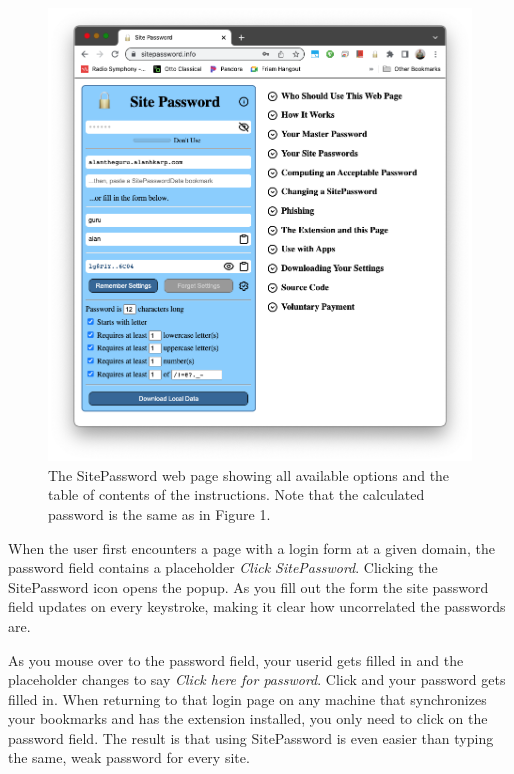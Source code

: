 \begin{figure}
\begin{center}
  \includegraphics[scale=0.30]{soupsfig2.png}
\end{center}
\caption{\label{fig:webpage} The SitePassword web page showing all available options and the table of contents of the instructions.  Note that the calculated password is the same as in Figure 1. }
\end{figure}

When the user first encounters a page with a login form at a given domain, the password field contains a placeholder {\em Click SitePassword}.  Clicking the SitePassword icon opens the popup.  As you fill out the form the site password field updates on every keystroke, making it clear how uncorrelated the passwords are.

As you  mouse over to the password field, your userid gets filled in and the placeholder changes to say {\em Click here for password}.  Click and your password gets filled in.  When returning to that login page on any machine that synchronizes your bookmarks and has the extension installed, you only need to click on the password field.  The result is that using SitePassword is even easier than typing the same, weak password for every site.

